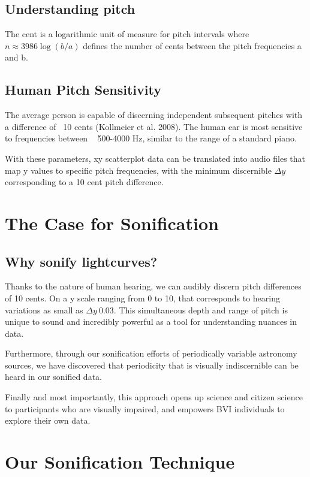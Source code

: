 \documentclass[]{acmsiggraph}
\begin{document}
\subsection{Understanding pitch}
The cent is a logarithmic unit of measure for pitch intervals where $n \approx 3986\log(b/a)$ defines the number of cents between the pitch frequencies a and b.

\subsection{Human Pitch Sensitivity}
The average person is capable of discerning independent subsequent pitches with a difference of ~10 cents (Kollmeier et al. 2008). The human ear is most sensitive to frequencies between ~ 500-4000 Hz, similar to the range of a standard piano.

With these parameters, xy scatterplot data can be translated into audio files that map y values to specific pitch frequencies, with the minimum discernible $\Delta y$ corresponding to a 10 cent pitch difference.

\section{The Case for Sonification}

\subsection{Why sonify lightcurves?}

Thanks to the nature of human hearing, we can audibly discern pitch differences of 10 cents. On a y scale ranging from 0 to 10, that corresponds to hearing variations as small as $\Delta y~0.03$. This simultaneous depth and range of pitch is unique to sound and incredibly powerful as a tool for understanding nuances in data.

Furthermore, through our sonification efforts of periodically variable astronomy sources, we have discovered that periodicity that is visually indiscernible can be heard in our sonified data.

Finally and most importantly, this approach opens up science and citizen science to participants who are visually impaired, and empowers BVI individuals to explore their own data.


\section{Our Sonification Technique}
\end{document}
